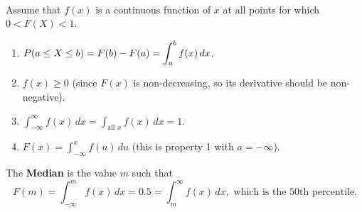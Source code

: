 \pagebreak


\begin{theorem}
    \phantom{}\\
    Assume that $f(x)$ is a continuous function of $x$ at  all points for which $0 < F(X) < 1$.
\begin{enumerate}
    \item $\displaystyle P(a \leq X \leq b) = F(b) - F(a) = \int_{a}^{b} f(x) \, dx$. \vspace{1mm}
    \item $f(x) \geq 0$ (since $F(x)$ is non-decreasing, so its derivative should be non-negative). \vspace{1mm}
    \item $\displaystyle \int_{-\infty}^{\infty} f(x) \, dx = \displaystyle \int_{\text{all $x$}} f(x) \, dx = 1$.
    \item $F(x) = \displaystyle \int_{-\infty}^{x} f(u) \, du$ (this is property 1 with $a = -\infty$). \\
\end{enumerate}
\end{theorem}


\begin{remark}
    The \textbf{Median} is the value $m$ such that
    \[
        F(m) = \displaystyle \int_{-\infty}^{m} f(x) \, dx = 0.5 = \displaystyle \int_{m}^{\infty} f(x) \, dx, \text{ which is the 50th percentile.}
    \]
\end{remark}

